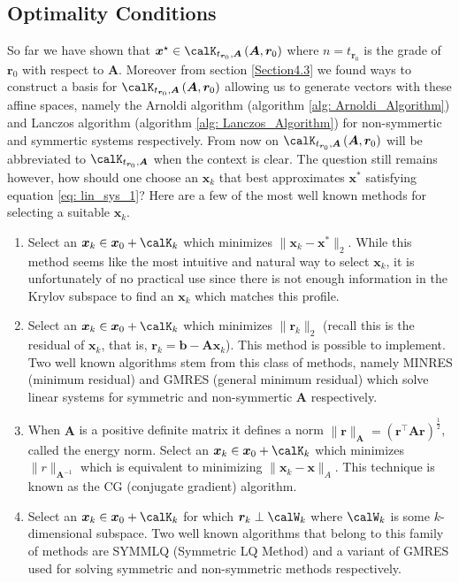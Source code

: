 \subsection{Optimality Conditions}\label{Section4.4}

So far we have shown that $\bm{x}^{\star} \in \calK_{t_{\bm{r}_0}, \bm{A}} \left( \bm{A}, \bm{r}_0 \right)$ where $n = t_{\bm{r}_0}$ is the grade of $\bm{r}_0$ with respect to $\bm{A}$. Moreover from section \ref{Section4.3} we found ways to construct a basis for $\calK_{t_{\bm{r}_0}, \bm{A}} \left( \bm{A}, \bm{r}_0 \right)$ allowing us to generate vectors with these affine spaces, namely the Arnoldi algorithm (algorithm \ref{alg: Arnoldi_Algorithm}) and Lanczos algorithm (algorithm \ref{alg: Lanczos_Algorithm}) for non-symmertic and symmertic systems respectively. From now on $\calK_{t_{\bm{r}_0}, \bm{A}} \left( \bm{A}, \bm{r}_0 \right)$ will be abbreviated to $\calK_{t_{\bm{r}_0}, \bm{A}}$ when the context is clear. The question still remains however, how should one choose an $\bm{x}_k$ that best approximates $\bm{x}^{\ast}$ satisfying equation \ref{eq: lin_sys_1}? Here are a few of the most well known methods for selecting a suitable $\bm{x}_k$.

\begin{enumerate}

    \item Select an $\bm{x}_k \in \bm{x}_0 + \calK_k$ which minimizes $\| \bm{x}_k - \bm{x}^{\ast} \|_2$. While this method seems like the most intuitive and natural way to select $\bm{x}_k$, it is unfortunately of no practical use since there is not enough information in the Krylov subspace to find an $\bm{x}_k$ which matches this profile.

    \item Select an $\bm{x}_k \in \bm{x}_0 + \calK_k$ which minimizes $\| \bm{r}_k \|_2$ (recall this is the residual of $\bm{x}_k$, that is, $\bm{r}_k = \bm{b} - \bm{A} \bm{x}_k$). This method is possible to implement. Two well known algorithms stem from this class of methods, namely MINRES (minimum residual) and GMRES (general minimum residual) which solve linear systems for symmetric and non-symmertic $\bm{A}$ respectively.

    \item When $\bm{A}$ is a positive definite matrix it defines a norm $\| \bm{r} \|_{\bm{A}} = \left( \bm{r}^{\intercal} \bm{A} \bm{r} \right)^{\frac{1}{2}}$, called the energy norm. Select an $\bm{x}_k \in \bm{x}_0 + \calK_k$ which minimizes $\| r \|_{\bm{A}^{-1}}$ which is equivalent to minimizing $\| \bm{x}_k - \bm{x} \|_{A}$. This technique is known as the CG (conjugate gradient) algorithm.

    \item Select an $\bm{x}_k \in \bm{x}_0 + \calK_k$ for which $\bm{r}_{k} \perp \calW_k$ where $\calW_k$ is some $k$-dimensional subspace. Two well known algorithms that belong to this family of methods are SYMMLQ (Symmetric LQ Method) and a variant of GMRES used for solving symmetric and non-symmetric methods respectively.

\end{enumerate}

